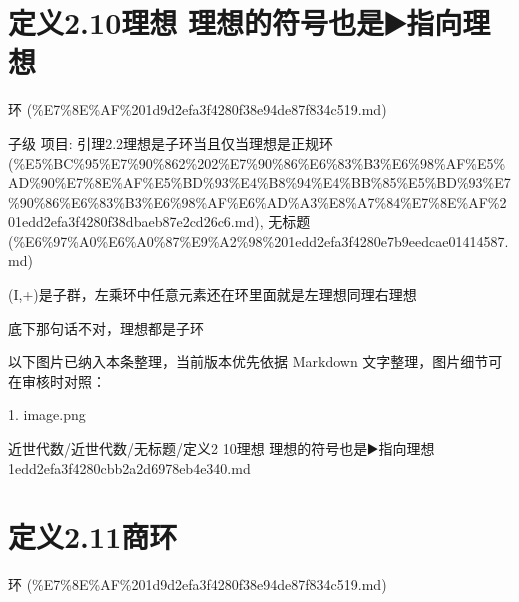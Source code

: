 \section*{定义2.10理想 理想的符号也是▶️指向理想}

\begin{note}[来源上级主题]

环 (\%E7\%8E\%AF\%201d9d2efa3f4280f38e94de87f834c519.md)

\end{note}

\begin{definition}

子级 项目: 引理2.2理想是子环当且仅当理想是正规环 (\%E5\%BC\%95\%E7\%90\%862\%202\%E7\%90\%86\%E6\%83\%B3\%E6\%98\%AF\%E5\%AD\%90\%E7\%8E\%AF\%E5\%BD\%93\%E4\%B8\%94\%E4\%BB\%85\%E5\%BD\%93\%E7\%90\%86\%E6\%83\%B3\%E6\%98\%AF\%E6\%AD\%A3\%E8\%A7\%84\%E7\%8E\%AF\%201edd2efa3f4280f38dbaeb87e2cd26c6.md), 无标题 (\%E6\%97\%A0\%E6\%A0\%87\%E9\%A2\%98\%201edd2efa3f4280e7b9eedcae01414587.md)

(I,+)是子群，左乘环中任意元素还在环里面就是左理想同理右理想

底下那句话不对，理想都是子环

\end{definition}

\begin{note}[关联图片]
以下图片已纳入本条整理，当前版本优先依据 Markdown 文字整理，图片细节可在审核时对照：

1. image.png\\

\end{note}

\begin{note}[来源路径]

近世代数/近世代数/无标题/定义2 10理想 理想的符号也是▶️指向理想 1edd2efa3f4280cbb2a2d6978eb4e340.md

\end{note}

\section*{定义2.11商环}

\begin{note}[来源上级主题]

环 (\%E7\%8E\%AF\%201d9d2efa3f4280f38e94de87f834c519.md)

\end{note}

